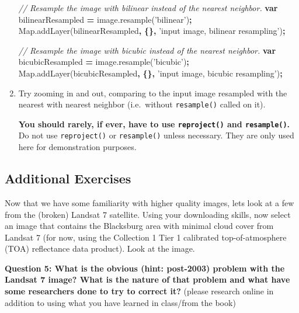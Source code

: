 \documentclass[
]{article}
\newenvironment{Shaded}{\begin{snugshade}}{\end{snugshade}}
\newcommand{\AttributeTok}[1]{\textcolor[rgb]{0.77,0.63,0.00}{#1}}
\newcommand{\CommentTok}[1]{\textcolor[rgb]{0.56,0.35,0.01}{\textit{#1}}}
\newcommand{\KeywordTok}[1]{\textcolor[rgb]{0.13,0.29,0.53}{\textbf{#1}}}
\newcommand{\NormalTok}[1]{#1}
\newcommand{\OperatorTok}[1]{\textcolor[rgb]{0.81,0.36,0.00}{\textbf{#1}}}
\newcommand{\StringTok}[1]{\textcolor[rgb]{0.31,0.60,0.02}{#1}}
\newcommand{\VariableTok}[1]{\textcolor[rgb]{0.00,0.00,0.00}{#1}}
\begin{document}
\begin{enumerate}
\begin{Shaded}
\begin{Highlighting}[]
\CommentTok{// Resample the image with bilinear instead of the nearest neighbor.}
\KeywordTok{var}\NormalTok{ bilinearResampled }\OperatorTok{=} \VariableTok{image}\NormalTok{.}\AttributeTok{resample}\NormalTok{(}\StringTok{'bilinear'}\NormalTok{)}\OperatorTok{;}
\VariableTok{Map}\NormalTok{.}\AttributeTok{addLayer}\NormalTok{(bilinearResampled}\OperatorTok{,} \OperatorTok{\{\},} \StringTok{'input image, bilinear resampling'}\NormalTok{)}\OperatorTok{;}

\CommentTok{// Resample the image with bicubic instead of the nearest neighbor.}
\KeywordTok{var}\NormalTok{ bicubicResampled }\OperatorTok{=} \VariableTok{image}\NormalTok{.}\AttributeTok{resample}\NormalTok{(}\StringTok{'bicubic'}\NormalTok{)}\OperatorTok{;}
\VariableTok{Map}\NormalTok{.}\AttributeTok{addLayer}\NormalTok{(bicubicResampled}\OperatorTok{,} \OperatorTok{\{\},} \StringTok{'input image, bicubic resampling'}\NormalTok{)}\OperatorTok{;}
\end{Highlighting}
\end{Shaded}
\item
  Try zooming in and out, comparing to the input image resampled with the nearest with nearest neighbor (i.e.~without \texttt{resample()} called on it).

  \textbf{You should rarely, if ever, have to use \texttt{reproject()} and \texttt{resample()}.} Do not use \texttt{reproject()} or \texttt{resample()} unless necessary. They are only used here for demonstration purposes.
\end{enumerate}

\hypertarget{additional-exercises}{%
\subsection{Additional Exercises}\label{additional-exercises}}

Now that we have some familiarity with higher quality images, lets look at a few from the (broken) Landsat 7 satellite. Using your downloading skills, now select an image that contains the Blacksburg area with minimal cloud cover from Landsat 7 (for now, using the Collection 1 Tier 1 calibrated top-of-atmosphere (TOA) reflectance data product). Look at the image.

\textbf{Question 5: What is the obvious (hint: post-2003) problem with the Landsat 7 image? What is the nature of that problem and what have some researchers done to try to correct it?} (please research online in addition to using what you have learned in class/from the book)
\end{document}
